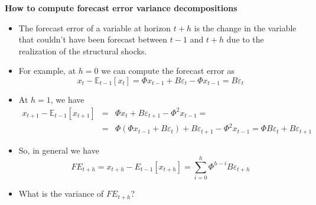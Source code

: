 \begin{frame}
{\textbf{How to compute {forecast error variance decompositions}}}

\begin{itemize}
\item The forecast error of a variable at horizon $t+h$ is the change in the
variable that couldn't have been forecast between $t-1$ and $t+h$ due to the
realization of the structural shocks.\bigskip

\item For example, at $h=0$ we can compute the forecast error as%
\begin{equation*}
x_{t}-\mathbb{E}_{t-1}[x_{t}]=\Phi x_{t-1}+B\varepsilon _{t}-\Phi
x_{t-1}=B\varepsilon _{t}
\end{equation*}

\item At $h=1$, we have 
\begin{eqnarray*}
x_{t+1}-\mathbb{E}_{t-1}[x_{t+1}] &=&\Phi x_{t}+B\varepsilon _{t+1}-\Phi
^{2}x_{t-1}= \\
&=&\Phi (\Phi x_{t-1}+B\varepsilon _{t})+B\varepsilon _{t+1}-\Phi
^{2}x_{t-1}=\Phi B\varepsilon _{t}+B\varepsilon _{t+1}
\end{eqnarray*}

\item So, in general we have 
\begin{equation*}
FE_{t+h}=x_{t+h}-E_{t-1}[x_{t+h}]=\sum_{i=0}^{h}\Phi ^{h-i}B\varepsilon
_{t+h}
\end{equation*}

\item What is the variance of $FE_{t+h}$?
\end{itemize}
\end{frame}


